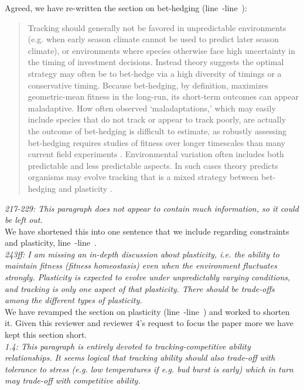 \documentclass[11pt,letterpaper]{article}
\newcommand{\lr}[1]{line~\lineref{#1}}
\begin{document}
Agreed, we have re-written the section on bet-hedging (\lr{bhS}-\lr{bhE}): 
\begin{quote}
Tracking should generally not be favored in unpredictable environments (e.g. when early season climate cannot be used to predict later season climate), or environments where species otherwise face high uncertainty in the timing of investment decisions. Instead theory suggests the optimal strategy may often be to bet-hedge \citep{Venable:2007os,donald2013,decasas2015} via a high diversity of timings or a conservative timing. Because bet-hedging, by definition, maximizes geometric-mean fitness in the long-run, its short-term outcomes can appear maladaptive. How often observed `maladaptations,' which may easily include species that do not track or appear to track poorly, are actually the outcome of bet-hedging is difficult to estimate, as robustly assessing bet-hedging requires studies of fitness over longer timescales than many current field experiments \citep{simons2011}. Environmental variation often includes both predictable and less predictable aspects. In such cases theory predicts organisms may evolve tracking that is a mixed strategy between bet-hedging and plasticity \citep{wong2005}.
\end{quote}

\emph{217-229: This paragraph does not appear to contain much information, so it could be left out.}\\

We have shortened this into one sentence that we include regarding constraints and plasticity, \lr{r1consS}-\lr{r1consE}.\\

\emph{243ff: I am missing an in-depth discussion about plasticity, i.e. the ability to maintain
fitness (fitness homeostasis) even when the environment fluctuates strongly. Plasticity is
expected to evolve under unpredictably varying conditions, and tracking is only one aspect of
that plasticity. There should be trade-offs among the different types of plasticity.}\\

We have revamped the section on plasticity (\lr{plasS}-\lr{plasE}) and worked to shorten it. Given this reviewer and reviewer 4's request to focus the paper more we have kept this section short.\\

\emph{1.4: This paragraph is entirely devoted to tracking-competitive ability relationships. It
seems logical that tracking ability should also trade-off with tolerance to stress (e.g. low
temperatures if e.g. bud burst is early) which in turn may trade-off with competitive
ability.}\\
\end{document}
